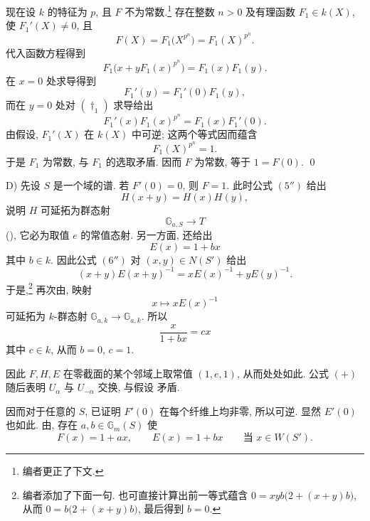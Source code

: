 现在设 \(k\) 的特征为 \(p\), 且 \(F\) 不为常数.\footnote{编者更正了下文.}
存在整数 \(n>0\) 及有理函数 \(F_1\in k(X)\), 使 \(F_1'(X)\ne0\), 且
\[
  F(X)=F_1\bigl(X^{p^n}\bigr)=F_1(X)^{p^n}.
\]
代入函数方程得到
\begin{equation}\tag{\(\dagger_1\)}
  F_1\bigl(x+yF_1(x)^{p^n}\bigr)=F_1(x)F_1(y).
\end{equation}
在 \(x=0\) 处求导得到
\begin{equation}\tag{\(\ast_1\)}
  F_1'(y)=F_1'(0)F_1(y),
\end{equation}
而在 \(y=0\) 处对 \((\dagger_1)\) 求导给出
\begin{equation}\tag{\(\ast'_1\)}
  F_1'(x)F_1(x)^{p^n}=F_1(x)F_1'(0).
\end{equation}
由假设, \(F_1'(X)\) 在 \(k(X)\) 中可逆; 这两个等式因而蕴含
\[
  F_1(X)^{p^n}=1.
\]
于是 \(F_1\) 为常数, 与 \(F_1\) 的选取矛盾. 因而 \(F\) 为常数, 等于 \(1=F(0)\).
\qed

\textup{D)} 先设 \(S\) 是一个域的谱. 若 \(F'(0)=0\), 则 \(F=1\). 此时公式 \((5'')\) 给出
\[
  H(x+y)=H(x)H(y),
\]
说明 \(H\) 可延拓为群态射
\[
  \mathbb G_{a,S}\longrightarrow T
\]
\textup{()}, 它必为取值 \(e\) 的常值态射. 另一方面,  还给出
\[
  E(x)=1+bx
\]
其中 \(b\in k\). 因此公式 \((6'')\) 对 \((x,y)\in N(S')\) 给出
\[
  (x+y)E(x+y)^{-1}=xE(x)^{-1}+yE(y)^{-1}.
\]
于是,\footnote{编者添加了下面一句. 也可直接计算出前一等式蕴含 \(0=xyb\bigl(2+(x+y)b\bigr)\), 从而 \(0=b\bigl(2+(x+y)b\bigr)\), 最后得到 \(b=0\).}
再次由, 映射
\[
  x\longmapsto xE(x)^{-1}
\]
可延拓为 \(k\)-群态射 \(\mathbb G_{a,k}\to\mathbb G_{a,k}\). 所以
\[
  \frac{x}{1+bx}=cx
\]
其中 \(c\in k\), 从而 \(b=0\), \(c=1\).

因此 \(F,H,E\) 在零截面的某个邻域上取常值 \((1,e,1)\), 从而处处如此. 公式 \((+)\) 随后表明 \(U_\alpha\) 与 \(U_{-\alpha}\) 交换, 与假设 \textup{} 矛盾.

因而对于任意的 \(S\), 已证明 \(F'(0)\) 在每个纤维上均非零, 所以可逆. 显然 \(E'(0)\) 也如此. 由, 存在 \(a,b\in\mathbb G_m(S)\) 使
\begin{equation}\tag{\(\diamondsuit_1\)}
  F(x)=1+ax,\qquad E(x)=1+bx
  \qquad\text{当 }x\in W(S').
\end{equation}

